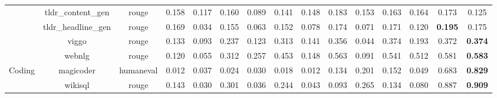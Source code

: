\begin{landscape}
\begin{table}[ht]
{\begin{tabular}{ccccccccccccccc}
                                   & tldr\_content\_gen             & rouge                            & 0.158              & 0.117             & 0.160                      & 0.089             & 0.141                      & 0.148               & 0.183                    & 0.153               & 0.163                        & 0.164                   & 0.173                  & 0.125          \\
                                   & tldr\_headline\_gen            & rouge                            & 0.169              & 0.034             & 0.155                      & 0.063             & 0.152                      & 0.078               & 0.174                    & 0.071               & 0.171                        & 0.120                   & \textbf{0.195}         & 0.175          \\
                                   & viggo                          & rouge                            & 0.133              & 0.093             & 0.237                      & 0.123             & 0.313                      & 0.141               & 0.356                    & 0.044               & 0.374                        & 0.193                   & 0.372                  & \textbf{0.374} \\
                                   & webnlg                         & rouge                            & 0.120              & 0.055             & 0.312                      & 0.257             & 0.453                      & 0.148               & 0.563                    & 0.091               & 0.541                        & 0.512                   & 0.581                  & \textbf{0.583} \\
\midrule
\multirow{2}{*}{Coding}            & magicoder                      & humaneval                        & 0.012              & 0.037             & 0.024                      & 0.030             & 0.018                      & 0.012               & 0.134                    & 0.201               & 0.152                        & 0.049                   & 0.683                  & \textbf{0.829} \\
                                   & wikisql                        & rouge                            & 0.143              & 0.030             & 0.301                      & 0.036             & 0.244                      & 0.043               & 0.093                    & 0.265               & 0.134                        & 0.080                   & 0.887                  & \textbf{0.909} \\

\end{tabular}}
\end{table}
\end{landscape}
